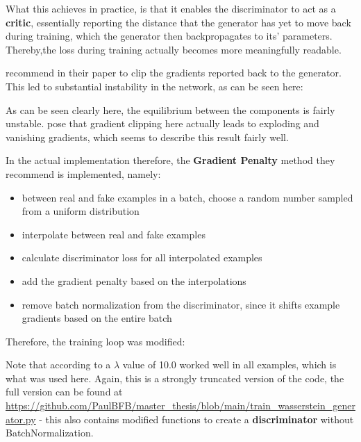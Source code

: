 What this achieves in practice, is that it enables the discriminator to act as a \textbf{critic}, essentially reporting the distance that the generator has yet to move back during training, 
which the generator then backpropagates to its' parameters. Thereby,the loss during training actually becomes more meaningfully readable.

\pagebreak

\cite{arjovsky2017wasserstein} recommend in their paper to clip the gradients reported back to the generator. This led to substantial instability in the network, as can be seen here:


As can be seen clearly here, the equilibrium between the components is fairly unstable.
\cite{gulrajani2017improved} pose that gradient clipping here actually leads to exploding and vanishing gradients, which seems to describe this result fairly well. 

In the actual implementation therefore, the \textbf{Gradient Penalty} method they recommend is implemented, namely:

\begin{itemize}
	\item between real and fake examples in a batch, choose a random number sampled from a uniform distribution
	\item interpolate between real and fake examples
	\item calculate discriminator loss for all interpolated examples
	\item add the gradient penalty based on the interpolations
	\item remove batch normalization from the discriminator, since it shifts example gradients based on the entire batch
\end{itemize}

\pagebreak

Therefore, the training loop was modified:



Note that according to \cite{gulrajani2017improved} a $\lambda$ value of 10.0 worked well in all examples, which is what was used here. Again, this is a strongly truncated version of the code, the full version can be found at \url{https://github.com/PaulBFB/master_thesis/blob/main/train_wasserstein_generator.py} - this also contains modified functions to create a \textbf{discriminator} without BatchNormalization.

